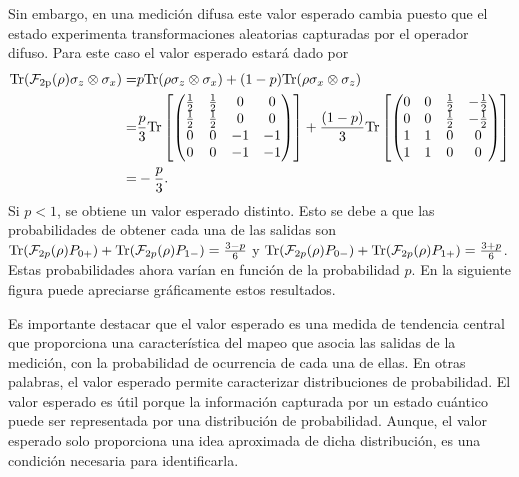 Sin embargo, en una medición difusa este valor esperado cambia puesto que el estado experimenta transformaciones aleatorias capturadas por el operador difuso. Para este caso el valor esperado estará dado por \begin{equation}\label{eq:valor-esperado-ejemplo-cap2}\begin{split}{\rm Tr}(\mathcal{F}_{2\text{p}}(\rho)\sigma_z\otimes \sigma_x)=&p{\rm Tr}(\rho\sigma_z\otimes \sigma_x )+(1-p){\rm Tr}(\rho\sigma_x\otimes \sigma_z )\\
    =& \frac{p}{3}{\rm Tr}\left[ \begin{pmatrix}
        \tfrac{1}{2}&\tfrac{1}{2}&0&0\\
        \tfrac{1}{2}&\tfrac{1}{2}&0&0\\
        0&0&-1&-1\\
        0&0&-1&-1\\
    \end{pmatrix}\right]+ \frac{(1-p)}{3}{\rm Tr}\left[ \begin{pmatrix}
        0&0&\tfrac{1}{2}&-\tfrac{1}{2}\\
        0&0&\tfrac{1}{2}&-\tfrac{1}{2}\\
        1&1&0&0\\
        1&1&0&0\\
    \end{pmatrix}\right]\\
    =&-\frac{p}{3}.
\end{split}\end{equation}Si $p<1$, se obtiene un valor esperado distinto. Esto se debe a
que las probabilidades de obtener cada una de las salidas son
${\rm Tr}(\mathcal{F}_{2p}(\rho)P_{0+})+{\rm Tr}(\mathcal{F}_{2p}(\rho)P_{1-})=\frac{3-p}{6}$
y
${\rm Tr}(\mathcal{F}_{2p}(\rho)P_{0-})+{\rm Tr}(\mathcal{F}_{2p}(\rho)P_{1+})=\frac{3+p}{6}$.
Estas probabilidades ahora varían en función de la probabilidad $p$. En la
siguiente figura puede apreciarse gráficamente estos resultados.










Es importante destacar que el valor esperado es una medida de tendencia central
que proporciona una característica del mapeo que asocia las salidas de la
medición, con la probabilidad de ocurrencia de cada una de ellas. En otras
palabras, el valor esperado permite caracterizar distribuciones de
probabilidad. El valor esperado es útil porque la información capturada por un
estado cuántico puede ser representada por una distribución de probabilidad.
Aunque, el valor esperado solo proporciona una idea aproximada de dicha
distribución, es una condición necesaria para identificarla. 

